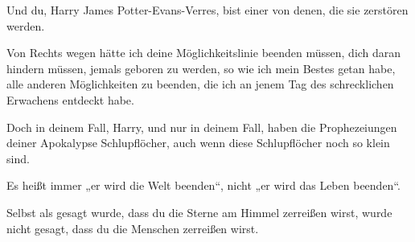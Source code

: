 \begin{writtenNote}
Und du, Harry James Potter-Evans-Verres, bist einer von denen, die sie zerstören werden.

Von Rechts wegen hätte ich deine Möglichkeitslinie beenden müssen, dich daran hindern müssen, jemals geboren zu werden, so wie ich mein Bestes getan habe, alle anderen Möglichkeiten zu beenden, die ich an jenem Tag des schrecklichen Erwachens entdeckt habe.

Doch in deinem Fall, Harry, und nur in deinem Fall, haben die Prophezeiungen deiner Apokalypse Schlupflöcher, auch wenn diese Schlupflöcher noch so klein sind.

Es heißt immer „er wird die Welt beenden“, nicht „er wird das Leben beenden“.

Selbst als gesagt wurde, dass du die Sterne am Himmel zerreißen wirst, wurde nicht gesagt, dass du die Menschen zerreißen wirst.


\end{writtenNote}
